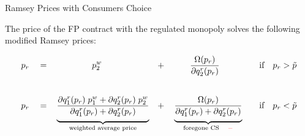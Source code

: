 \documentclass{class}
\begin{document}
\begin{frame}{Ramsey Prices with Consumers Choice}\label{RamseyOutside}


\begin{lemma}

 
The price of the FP contract with the regulated monopoly solves the following modified Ramsey prices:
 

\begin{equation*}
\begin{aligned}
      p_r \quad=\quad & \quad \quad \quad \quad  \; p_2^w & + \quad& \quad\quad\frac{\Omega(p_r)}{\partial q_2^r(p_r)} & \quad \text{if}  \quad p_r > \Tilde{p} \\\\
      p_r\quad =\quad & \underbrace{\Bigg. \frac{\partial q_1^r(p_r) \; p_1^w + \partial q_2^r(p_r) \; p_2^w}{ \partial q_1^r(p_r)+ \partial q_2^r(p_r) }\Bigg.}_{\text{weighted average price} }&+\quad &  \underbrace{\Bigg. \frac{ \Omega(p_r)}{ \partial q_1^r(p_r) + \partial q_2^r(p_r)} \Bigg.}_{\text{foregone CS} \quad \textcolor{red}{-}}  & \quad\text{if} \quad p_r < \Tilde{p} 
\end{aligned}
\end{equation*}

\end{lemma}

\vfill


\hyperlink{CaseRamsey}{} \hyperlink{RamseyPrices}{} 

\end{frame}

    
    
\end{document}

